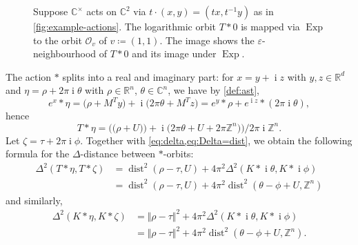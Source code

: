\documentclass[10pt,a4paper]{article}
\theoremstyle{definition}
\DeclareMathOperator{\ii}{i}
\DeclareMathOperator{\Exp}{Exp}
\DeclareMathOperator{\dist}{dist}
\newcommand{\CC}{\mathbb{C}}
\newcommand{\ZZ}{\mathbb{Z}}
\newcommand{\RR}{\mathbb{R}}
\newcommand{\OO}{\ensuremath{\mathcal{O}}}
\numberwithin{equation}{section}
\begin{document}
\begin{figure}
\caption{Suppose $\CC^\times$ acts on $\CC^2$ via $t\cdot (x,y)=(tx,t^{-1}y)$ as in \cref{fig:example-actions}.
The logarithmic orbit $T\ast 0$ is mapped via $\Exp$ to the orbit $\OO_v$ of $v\coloneqq (1,1)$.
The image shows the $\varepsilon$-neighbourhood of $T\ast 0$ and its image under $\Exp$.
\label{fig:kempf ness example}
}
\end{figure}

The action $*$ splits into a real and imaginary part:
for $x=y+\ii z$ with $y,z\in\RR^d$ and $\eta = \rho+2\pi\ii\theta$
with $\rho\in\RR^n$, $\theta\in\CC^n$, we have by \cref{def:ast},
\begin{equation}\label{eq:indep}
	e^x \ast \eta
  = \big(\rho + M^T y\big) + \ii\big( 2\pi\theta + M^T z\big)
  = e^y \ast \rho +e^{\ii z}\ast (2\pi\ii\theta) ,
\end{equation}
hence
\begin{equation*}
		T\ast\eta
		= \Big( \big(\rho+ U)\big) + \ii \big(2\pi\theta+ U +2\pi\ZZ^n\big)\Big)\big/2\pi\ii\ZZ^n .
\end{equation*}
Let $\zeta=\tau+2\pi\ii\phi$.
Together with \cref{eq:delta,eq:Delta=dist}, we obtain the following formula for the $\Delta$-distance between $\ast$-orbits:
\begin{equation}\label{prop:delta-orbit-distance}
\begin{aligned}
\Delta^2(T\ast\eta,T\ast\zeta)
 &= \dist^2(\rho-\tau, U) + 4\pi^2 \Delta^2(K\ast \ii\theta, K\ast \ii\phi) \\
 &= \dist^2(\rho-\tau, U) + 4\pi^2 \dist^2(\theta-\phi + U, \ZZ^n)
\end{aligned}
\end{equation}
and similarly,
\begin{equation}\label{prop:Kdelta-orbit-distance}
\begin{aligned}
 \Delta^2(K\ast\eta, K\ast\zeta)
 &= \Vert \rho-\tau \Vert^2 + 4\pi^2 \Delta^2(K\ast \ii\theta, K\ast \ii\phi) \\
 &= \Vert \rho-\tau \Vert^2 + 4\pi^2 \dist^2(\theta-\phi + U, \ZZ^n) .
\end{aligned}
\end{equation}
\end{document}
